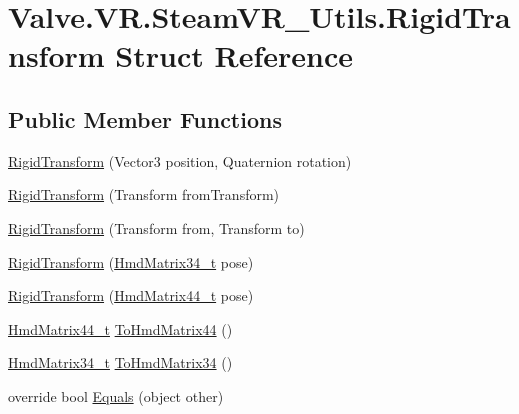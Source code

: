 \hypertarget{struct_valve_1_1_v_r_1_1_steam_v_r___utils_1_1_rigid_transform}{}\section{Valve.\+V\+R.\+Steam\+V\+R\+\_\+\+Utils.\+Rigid\+Transform Struct Reference}
\label{struct_valve_1_1_v_r_1_1_steam_v_r___utils_1_1_rigid_transform}
\subsection*{Public Member Functions}
\begin{DoxyCompactItemize}
\item 
\mbox{\hyperlink{struct_valve_1_1_v_r_1_1_steam_v_r___utils_1_1_rigid_transform_ac607cc418aa0f6395d0e063fe445ce6f}{Rigid\+Transform}} (Vector3 position, Quaternion rotation)
\item 
\mbox{\hyperlink{struct_valve_1_1_v_r_1_1_steam_v_r___utils_1_1_rigid_transform_aff474c4ea8978e70b0158d1392dafaef}{Rigid\+Transform}} (Transform from\+Transform)
\item 
\mbox{\hyperlink{struct_valve_1_1_v_r_1_1_steam_v_r___utils_1_1_rigid_transform_ae5cbef3eb23b3cc409e7cd5cae107612}{Rigid\+Transform}} (Transform from, Transform to)
\item 
\mbox{\hyperlink{struct_valve_1_1_v_r_1_1_steam_v_r___utils_1_1_rigid_transform_a16d19bec844269a7c8033425df723f9e}{Rigid\+Transform}} (\mbox{\hyperlink{struct_valve_1_1_v_r_1_1_hmd_matrix34__t}{Hmd\+Matrix34\+\_\+t}} pose)
\item 
\mbox{\hyperlink{struct_valve_1_1_v_r_1_1_steam_v_r___utils_1_1_rigid_transform_a319494a450bd550d813b067e5b52a118}{Rigid\+Transform}} (\mbox{\hyperlink{struct_valve_1_1_v_r_1_1_hmd_matrix44__t}{Hmd\+Matrix44\+\_\+t}} pose)
\item 
\mbox{\hyperlink{struct_valve_1_1_v_r_1_1_hmd_matrix44__t}{Hmd\+Matrix44\+\_\+t}} \mbox{\hyperlink{struct_valve_1_1_v_r_1_1_steam_v_r___utils_1_1_rigid_transform_a61d4c42b4c657c8fbe6722ea001ada9b}{To\+Hmd\+Matrix44}} ()
\item 
\mbox{\hyperlink{struct_valve_1_1_v_r_1_1_hmd_matrix34__t}{Hmd\+Matrix34\+\_\+t}} \mbox{\hyperlink{struct_valve_1_1_v_r_1_1_steam_v_r___utils_1_1_rigid_transform_a6f239f71cb7465d26cd782037a31f4b9}{To\+Hmd\+Matrix34}} ()
\item 
override bool \mbox{\hyperlink{struct_valve_1_1_v_r_1_1_steam_v_r___utils_1_1_rigid_transform_ae5da80c745e0b9f2736a0c5f5b526b2c}{Equals}} (object other)

\end{DoxyCompactItemize}
